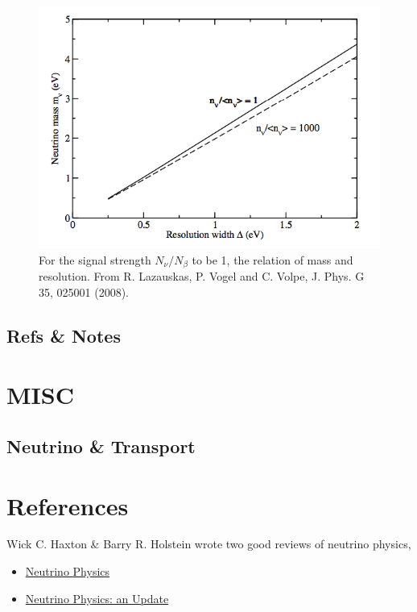 \documentclass[letterpaper,12pt,english]{sphinxmanual}
\begin{document}
\begin{figure}[htbp]
\centering
\capstart

\includegraphics{resolutionRequirement4DifferentMass.png}
\caption{For the signal strength \(N_\nu/N_\beta\) to be 1, the relation of mass and resolution. From R. Lazauskas, P. Vogel and C. Volpe, J. Phys. G 35, 025001 (2008).}\end{figure}


\section{Refs \& Notes}
\label{cosmology:refs-notes}

\chapter{MISC}
\label{misc:misc}\label{misc::doc}

\section{Neutrino \& Transport}
\label{misc:neutrino-transport}

\chapter{References}
\label{ref:references}\label{ref::doc}
Wick C. Haxton \& Barry R. Holstein wrote two good reviews of neutrino physics,
\begin{itemize}
\item {} 
\href{http://arxiv.org/abs/hep-ph/9905257v1}{Neutrino Physics}

\item {} 
\href{http://arxiv.org/abs/hep-ph/0306282v1}{Neutrino Physics: an Update}

\end{itemize}
\end{document}
